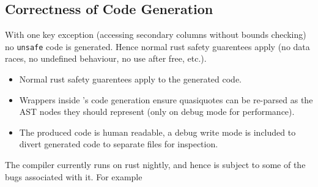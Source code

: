 \subsection{Correctness of Code Generation}
With one key exception (accessing secondary columns without bounds checking) no \texttt{unsafe} code is generated. Hence normal rust safety guarentees apply (no data races, no undefined behaviour, no use after free, etc.).
\begin{itemize}
    \item Normal rust safety guarentees apply to the generated code.
    \item Wrappers inside \emdb's code generation ensure quasiquotes can be re-parsed as the AST nodes they should represent (only on debug mode for performance).
    \item The produced code is human readable, a debug write mode is included to divert generated code to separate files for inspection.
\end{itemize}

The \emdb compiler currently runs on rust nightly, and hence is subject to some of the bugs associated with it.
For example 


